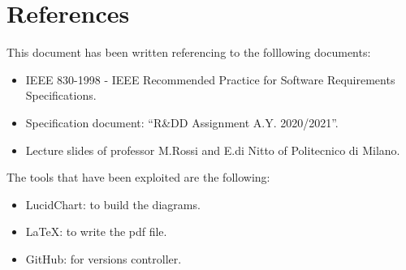 \chapter{References}

This document has been written referencing to the folllowing documents: 
\begin{itemize}
	\item IEEE 830-1998 - IEEE Recommended Practice for Software Requirements Specifications.
	\item Specification document: “R\&DD Assignment A.Y. 2020/2021”.
	\item Lecture slides of professor M.Rossi and E.di Nitto of Politecnico di Milano.
\end{itemize}
The tools that have been exploited are the following:
\begin{itemize}
	\item LucidChart: to build the diagrams.
	\item LaTeX: to write the pdf file.
	\item GitHub: for versions controller.
\end{itemize}